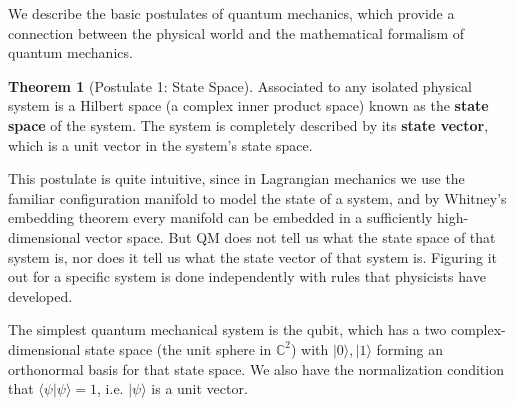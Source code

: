 \documentclass{article}
\theoremstyle{definition}
\newtheorem{theorem}{Theorem}[section]
\begin{document}
    We describe the basic postulates of quantum mechanics, which provide a connection between the physical world and the mathematical formalism of quantum mechanics.

    \begin{theorem}[Postulate 1: State Space]
      Associated to any isolated physical system is a Hilbert space (a complex inner product space) known as the \textbf{state space} of the system. The system is completely described by its \textbf{state vector}, which is a unit vector in the system's state space. 
    \end{theorem}

    This postulate is quite intuitive, since in Lagrangian mechanics we use the familiar configuration manifold to model the state of a system, and by Whitney's embedding theorem every manifold can be embedded in a sufficiently high-dimensional vector space. But QM does not tell us what the state space of that system is, nor does it tell us what the state vector of that system is. Figuring it out for a specific system is done independently with rules that physicists have developed.

    The simplest quantum mechanical system is the qubit, which has a two complex-dimensional state space (the unit sphere in $\mathbb{C}^2$) with $|0\rangle, |1\rangle$ forming an orthonormal basis for that state space. We also have the normalization condition that $\langle \psi | \psi \rangle = 1$, i.e. $|\psi\rangle$ is a unit vector.   
\end{document}
